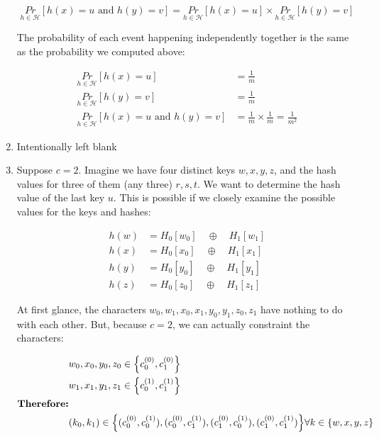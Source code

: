 \documentclass[11pt]{article}
\theoremstyle{definition}
\theoremstyle{case}
\theoremstyle{theorem}
\begin{document}
\begin{enumerate}[label=(\alph*)]
\[
  \underset{h \in \mathcal{H}}{Pr}[ h(x) = u \text{ and } h(y) = v ] = \underset{h \in \mathcal{H}}{Pr}[ h(x) = u ] \times \underset{h \in \mathcal{H}}{Pr}[ h(y) = v ] 
\]

The probability of each event happening independently together is the same as the probability we computed above:

\begin{align*}
  \underset{h \in \mathcal{H}}{Pr}[ h(x) = u ] &= \frac{1}{m} \\
  \underset{h \in \mathcal{H}}{Pr}[ h(y) = v ] &= \frac{1}{m} \\
  \underset{h \in \mathcal{H}}{Pr}[ h(x) = u \text{ and } h(y) = v ] &= \frac{1}{m} \times \frac{1}{m} = \frac{1}{m^2}
\end{align*}

\item Intentionally left blank

\item Suppose $c = 2$. Imagine we have four distinct keys $w, x, y, z$, and the hash values for three of them (any three) $r, s, t$. 
We want to determine the hash value of the last key $u$. This is possible if we closely examine the possible values for the keys and hashes:

\begin{align*}
  h(w) &= H_0[w_0] \quad \oplus \quad H_1[w_1] \\
  h(x) &= H_0[x_0] \quad \oplus \quad H_1[x_1] \\
  h(y) &= H_0[y_0] \quad \oplus \quad H_1[y_1] \\
  h(z) &= H_0[z_0] \quad \oplus \quad H_1[z_1]
\end{align*}

At first glance, the characters $w_0, w_1, x_0, x_1, y_0, y_1, z_0, z_1$ have nothing to do with each other. But,
because $c = 2$, we can actually constraint the characters:

\begin{align*}
  &w_0, x_0, y_0, z_0 \in \Big \{ c_0^{(0)}, c_1^{(0)} \Big \} \\
  &w_1, x_1, y_1, z_1 \in \Big \{ c_0^{(1)}, c_1^{(1)} \Big \} \\  
  \vspace{10px}
  \textbf{Therefore:}& \\
  &(k_0, k_1) \in \Big \{ (c_0^{(0)}, c_0^{(1)}), (c_0^{(0)}, c_1^{(1)}), (c_1^{(0)}, c_0^{(1)}), (c_1^{(0)}, c_1^{(1)}) \Big \} \forall k \in \{w, x, y, z\} \\
\end{align*}


\end{enumerate}
\end{document}
